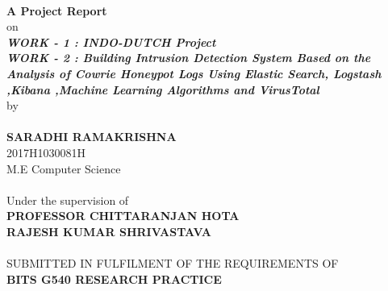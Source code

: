 \documentclass{report}
\begin{document}
\paragraph{}
\begin{center}
\textbf{A Project Report } \\[20pt]
on \\[20pt]

\textbf{\large{\textsl{WORK - 1 : INDO-DUTCH Project }}} \\[20pt]

\textbf{\large{\textsl{WORK - 2 : Building Intrusion Detection System Based on the Analysis of Cowrie Honeypot Logs Using Elastic Search, Logstash ,Kibana ,Machine Learning Algorithms and VirusTotal }}} \\[20pt]

by 
\end{center}

\paragraph{}
\begin{center}
\textbf{SARADHI RAMAKRISHNA} \\
2017H1030081H \\
M.E Computer Science
\end{center}

\paragraph{}
\begin{center}
Under the supervision of \\
\textbf{PROFESSOR CHITTARANJAN HOTA} \\
\textbf{RAJESH KUMAR SHRIVASTAVA }
\end{center}

\paragraph{}
\begin{center}
SUBMITTED IN FULFILMENT OF THE REQUIREMENTS OF \\
\textbf{BITS G540 RESEARCH PRACTICE}
\end{center}
\end{document}
